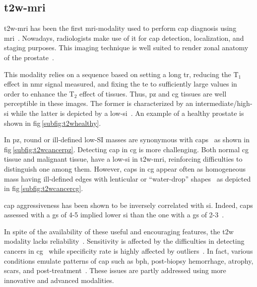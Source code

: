 \subsection{\acs*{t2w}-\acs*{mri}}\label{subsec:chp2:imaging:t2w}
\ac{t2w}-\ac{mri} has been the first \ac{mri}-modality used to perform \ac{cap}
diagnosis using \ac{mri}~\cite{Hricak1983}.
Nowadays, radiologists make use of it for \ac{cap} detection, localization, and
staging purposes.
This imaging technique is well suited to render zonal anatomy of the
prostate~\cite{Barentsz2012}.

This modality relies on a sequence based on setting a long \ac{tr}, reducing
the T$_{1}$ effect in \ac{nmr} signal measured, and fixing the \ac{te} to
sufficiently large values in order to enhance the T$_{2}$ effect of tissues.
Thus, \ac{pz} and \ac{cg} tissues are well perceptible in these images.
The former is characterized by an intermediate/high-\ac{si} while the latter is
depicted by a low-\ac{si}~\cite{Hricak1987}.
An example of a healthy prostate is shown in \acs{fig}\,\ref{subfig:t2whealthy}.

In \ac{pz}, round or ill-defined low-SI masses are synonymous with
\acp{cap}~\cite{Hricak1983} as shown in \acs{fig}\,\ref{subfig:t2wcancerpz}.
Detecting \ac{cap} in \ac{cg} is more challenging.
Both normal \ac{cg} tissue and malignant tissue, have a low-\ac{si} in
\ac{t2w}-\ac{mri}, reinforcing difficulties to distinguish one among them.
However, \acp{cap} in \ac{cg} appear often as homogeneous mass having
ill-defined edges with lenticular or ``water-drop''
shapes~\cite{Akin2006,Barentsz2012} as depicted in
\acs{fig}\,\ref{subfig:t2wcancercg}.

\ac{cap} aggressiveness has been shown to be inversely correlated with \ac{si}.
Indeed, \acp{cap} assessed with a \ac{gs} of 4-5 implied lower \ac{si} than the
one with a \ac{gs} of 2-3~\cite{Wang2008}.

In spite of the availability of these useful and encouraging features, the
\ac{t2w} modality lacks reliability~\cite{Kirkham2006,Hoeks2011}.
Sensitivity is affected by the difficulties in detecting cancers in
\ac{cg}~\cite{Kirkham2006} while specificity rate is highly affected by
outliers~\cite{Barentsz2012}.
In fact, various conditions emulate patterns of \ac{cap} such as \ac{bph},
post-biopsy hemorrhage, atrophy, scars, and
post-treatment~\cite{Hricak1987,Quint1991,Scheidler1999,Cruz2002,Barentsz2012}.
These issues are partly addressed using more innovative and advanced modalities.

